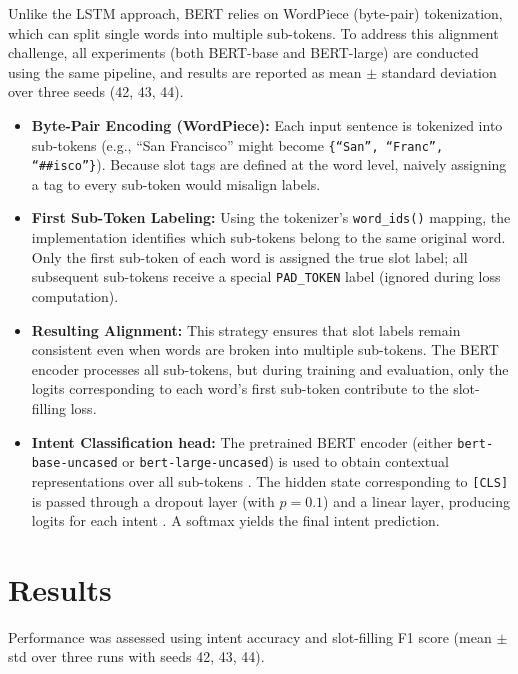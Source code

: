\documentclass[a4paper]{article}
\begin{document}
Unlike the LSTM approach, BERT relies on WordPiece (byte-pair) tokenization, which can split single words into multiple sub-tokens. To address this alignment challenge, all experiments (both BERT-base and BERT-large) are conducted using the same pipeline, and results are reported as mean \(\pm\) standard deviation over three seeds (42, 43, 44).

\begin{itemize}
  \item \textbf{Byte-Pair Encoding (WordPiece):} Each input sentence is tokenized into sub-tokens (e.g., “San Francisco” might become \texttt{\{``San'', ``Franc'', ``\#\#isco''\}}). Because slot tags are defined at the word level, naively assigning a tag to every sub-token would misalign labels.
  \item \textbf{First Sub-Token Labeling:} Using the tokenizer’s \texttt{word\_ids()} mapping, the implementation identifies which sub-tokens belong to the same original word. Only the first sub-token of each word is assigned the true slot label; all subsequent sub-tokens receive a special \texttt{PAD\_TOKEN} label (ignored during loss computation).
  \item \textbf{Resulting Alignment:} This strategy ensures that slot labels remain consistent even when words are broken into multiple sub-tokens. The BERT encoder processes all sub-tokens, but during training and evaluation, only the logits corresponding to each word’s first sub-token contribute to the slot-filling loss.  
  \item \textbf{Intent Classification head:} The pretrained BERT encoder (either \texttt{bert-base-uncased} or \texttt{bert-large-uncased}) is used to obtain contextual representations over all sub-tokens \cite{devlin2019bert, huggingface-bert}. The hidden state corresponding to \texttt{[CLS]} is passed through a dropout layer (with \(p=0.1\)) and a linear layer, producing logits for each intent \cite{chen2019bert}. A softmax yields the final intent prediction.
\end{itemize}



\section{Results}
Performance was assessed using intent accuracy and slot-filling F1 score (mean \(\pm\) std over three runs with seeds 42, 43, 44).
\end{document}
